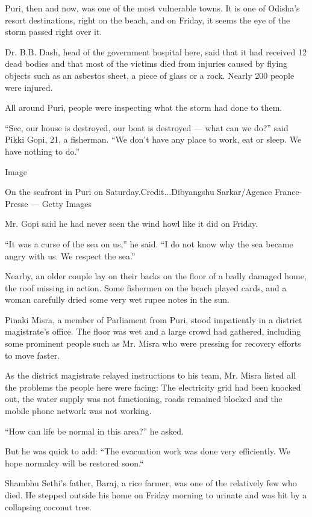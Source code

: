 Puri, then and now, was one of the most vulnerable towns. It is one of
Odisha's resort destinations, right on the beach, and on Friday, it
seems the eye of the storm passed right over it.

Dr. B.B. Dash, head of the government hospital here, said that it had
received 12 dead bodies and that most of the victims died from injuries
caused by flying objects such as an asbestos sheet, a piece of glass or
a rock. Nearly 200 people were injured.

All around Puri, people were inspecting what the storm had done to them.

``See, our house is destroyed, our boat is destroyed --- what can we
do?'' said Pikki Gopi, 21, a fisherman. ``We don't have any place to
work, eat or sleep. We have nothing to do.''

Image

On the seafront in Puri on Saturday.Credit...Dibyangshu Sarkar/Agence
France-Presse --- Getty Images

Mr. Gopi said he had never seen the wind howl like it did on Friday.

``It was a curse of the sea on us,'' he said. ``I do not know why the
sea became angry with us. We respect the sea.''

Nearby, an older couple lay on their backs on the floor of a badly
damaged home, the roof missing in action. Some fishermen on the beach
played cards, and a woman carefully dried some very wet rupee notes in
the sun.

Pinaki Misra, a member of Parliament from Puri, stood impatiently in a
district magistrate's office. The floor was wet and a large crowd had
gathered, including some prominent people such as Mr. Misra who were
pressing for recovery efforts to move faster.

As the district magistrate relayed instructions to his team, Mr. Misra
listed all the problems the people here were facing: The electricity
grid had been knocked out, the water supply was not functioning, roads
remained blocked and the mobile phone network was not working.

``How can life be normal in this area?'' he asked.

But he was quick to add: ``The evacuation work was done very
efficiently. We hope normalcy will be restored soon.``

Shambhu Sethi's father, Baraj, a rice farmer, was one of the relatively
few who died. He stepped outside his home on Friday morning to urinate
and was hit by a collapsing coconut tree.

